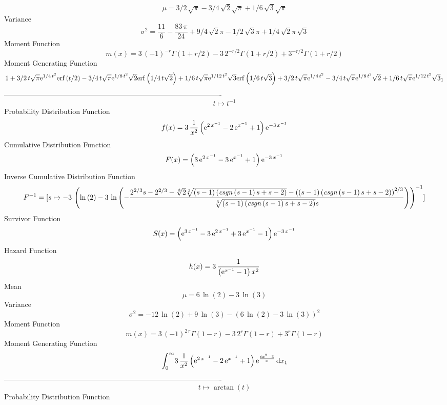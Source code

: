 \documentclass[12pt]{article}
\begin{document}
 $$ \mu=3/2\,\sqrt {\pi}-3/4\,\sqrt {2}\sqrt {\pi}+1/6\,\sqrt {3}\sqrt {\pi}
$$ Variance 
 $$ \sigma^2 = {\frac{11}{6}}-{\frac {83\,\pi}{24}}+9/4\,\sqrt {2}\pi-1/2\,\sqrt {3}
\pi+1/4\,\sqrt {2}\pi\,\sqrt {3}
$$Moment Function 
 $$ m(x) = 3\, \left( -1 \right) ^{-r}\Gamma \left( 1+r/2 \right) -3\,{2}^{-r/2}
\Gamma \left( 1+r/2 \right) +{3}^{-r/2}\Gamma \left( 1+r/2 \right) 
$$ Moment Generating Function 
 $$1+3/2\,t\sqrt {\pi}{{\rm e}^{1/4\,{t}^{2}}}{\rm erf} \left(t/2\right)-
3/4\,t\sqrt {\pi}{{\rm e}^{1/8\,{t}^{2}}}\sqrt {2}{\rm erf} \left(1/4
\,t\sqrt {2}\right)+1/6\,t\sqrt {\pi}{{\rm e}^{1/12\,{t}^{2}}}\sqrt {3
}{\rm erf} \left(1/6\,t\sqrt {3}\right)+3/2\,t\sqrt {\pi}{{\rm e}^{1/4
\,{t}^{2}}}-3/4\,t\sqrt {\pi}{{\rm e}^{1/8\,{t}^{2}}}\sqrt {2}+1/6\,t
\sqrt {\pi}{{\rm e}^{1/12\,{t}^{2}}}\sqrt {3}_{{1}}
$$-------------------------------------------------------------------------------------------  \\$$t\mapsto {t}^{-1}
$$Probability Distribution Function 
$$  f(x)=3\,{\frac {1}{{x}^{2}} \left( {{\rm e}^{2\,{x}^{-1}}}-2\,{{\rm e}^{{x}
^{-1}}}+1 \right) {{\rm e}^{-3\,{x}^{-1}}}}
$$Cumulative Distribution Function  
 $$F(x)= \left( 3\,{{\rm e}^{2\,{x}^{-1}}}-3\,{{\rm e}^{{x}^{-1}}}+1 \right) {
{\rm e}^{-3\,{x}^{-1}}}
$$ Inverse Cumulative Distribution Function 
  $$F^{-1} = [s\mapsto -3\, \left( \ln  \left( 2 \right) -3\,\ln  \left( -{\frac {{
2}^{2/3}s-{2}^{2/3}-\sqrt [3]{2}\sqrt [3]{ \left( s-1 \right)  \left( 
{\it csgn} \left( s-1 \right) s+s-2 \right) }- \left(  \left( s-1
 \right)  \left( {\it csgn} \left( s-1 \right) s+s-2 \right)  \right) 
^{2/3}}{\sqrt [3]{ \left( s-1 \right)  \left( {\it csgn} \left( s-1
 \right) s+s-2 \right) }s}} \right)  \right) ^{-1}]
$$Survivor Function 
 $$ S(x)= \left( {{\rm e}^{3\,{x}^{-1}}}-3\,{{\rm e}^{2\,{x}^{-1}}}+3\,{{\rm e}
^{{x}^{-1}}}-1 \right) {{\rm e}^{-3\,{x}^{-1}}}
$$ Hazard Function 
 $$ h(x)=3\,{\frac {1}{ \left( {{\rm e}^{{x}^{-1}}}-1 \right) {x}^{2}}}
$$Mean 
 $$ \mu=6\,\ln  \left( 2 \right) -3\,\ln  \left( 3 \right) 
$$ Variance 
 $$ \sigma^2 = -12\,\ln  \left( 2 \right) +9\,\ln  \left( 3 \right) - \left( 6\,\ln 
 \left( 2 \right) -3\,\ln  \left( 3 \right)  \right) ^{2}
$$Moment Function 
 $$ m(x) = 3\, \left( -1 \right) ^{2\,r}\Gamma \left( 1-r \right) -3\,{2}^{r}
\Gamma \left( 1-r \right) +{3}^{r}\Gamma \left( 1-r \right) 
$$ Moment Generating Function 
 $$\int_{0}^{\infty }\!3\,{\frac {1}{{x}^{2}} \left( {{\rm e}^{2\,{x}^{-1
}}}-2\,{{\rm e}^{{x}^{-1}}}+1 \right) {{\rm e}^{{\frac {t{x}^{2}-3}{x}
}}}}\,{\rm d}x_{{1}}
$$-------------------------------------------------------------------------------------------  \\$$t\mapsto \arctan \left( t \right) 
$$Probability Distribution Function 
\end{document}
